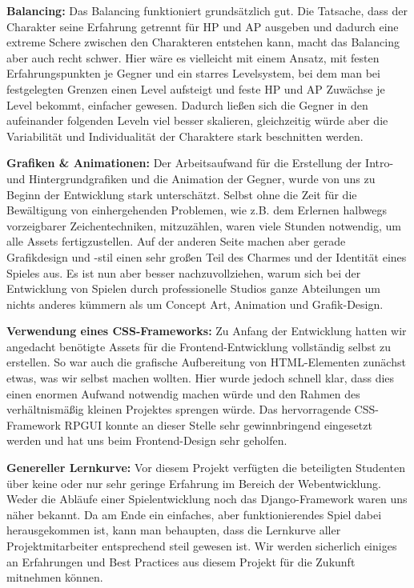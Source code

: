     \textbf{Balancing:} Das Balancing funktioniert grundsätzlich gut. Die Tatsache, dass der Charakter seine Erfahrung getrennt für HP und AP ausgeben und dadurch eine extreme Schere zwischen den Charakteren entstehen kann, macht das Balancing aber auch recht schwer. Hier wäre es vielleicht mit einem Ansatz, mit festen Erfahrungspunkten je Gegner und ein starres Levelsystem, bei dem man bei festgelegten Grenzen einen Level aufsteigt und feste HP und AP Zuwächse je Level bekommt, einfacher gewesen. Dadurch ließen sich die Gegner in den aufeinander folgenden Leveln viel besser skalieren, gleichzeitig würde aber die Variabilität und Individualität der Charaktere stark beschnitten werden.
    
    \textbf{Grafiken \& Animationen:} Der Arbeitsaufwand für die Erstellung der Intro- und Hintergrundgrafiken und die Animation der Gegner, wurde von uns zu Beginn der Entwicklung stark unterschätzt. Selbst ohne die Zeit für die Bewältigung von einhergehenden Problemen, wie z.B. dem Erlernen halbwegs vorzeigbarer Zeichentechniken, mitzuzählen, waren viele Stunden notwendig, um alle Assets fertigzustellen. Auf der anderen Seite machen aber gerade Grafikdesign und -stil einen sehr großen Teil des Charmes und der Identität eines Spieles aus. Es ist nun aber besser nachzuvollziehen, warum sich bei der Entwicklung von Spielen durch professionelle Studios ganze Abteilungen um nichts anderes kümmern als um Concept Art, Animation und Grafik-Design.
    
    \textbf{Verwendung eines CSS-Frameworks:} Zu Anfang der Entwicklung hatten wir angedacht benötigte Assets für die Frontend-Entwicklung vollständig selbst zu erstellen. So war auch die grafische Aufbereitung von HTML-Elementen zunächst etwas, was wir selbst machen wollten. Hier wurde jedoch schnell klar, dass dies einen enormen Aufwand notwendig machen würde und den Rahmen des verhältnismäßig kleinen Projektes sprengen würde. Das hervorragende CSS-Framework RPGUI konnte an dieser Stelle sehr gewinnbringend eingesetzt werden und hat uns beim Frontend-Design sehr geholfen.
    
    \textbf{Genereller Lernkurve:} Vor diesem Projekt verfügten die beteiligten Studenten über keine oder nur sehr geringe Erfahrung im Bereich der Webentwicklung. Weder die Abläufe einer Spielentwicklung noch das Django-Framework waren uns näher bekannt. Da am Ende ein einfaches, aber funktionierendes Spiel dabei herausgekommen ist, kann man behaupten, dass die Lernkurve aller Projektmitarbeiter entsprechend steil gewesen ist. Wir werden sicherlich einiges an Erfahrungen und Best Practices aus diesem Projekt für die Zukunft mitnehmen können.   


